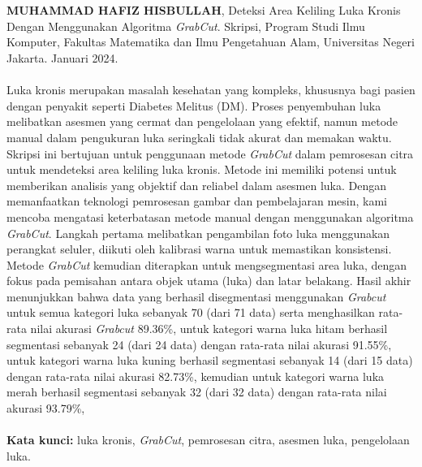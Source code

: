 \chapter*{}
\singlespacing{}

\textbf{MUHAMMAD HAFIZ HISBULLAH}, Deteksi Area Keliling Luka Kronis Dengan 
Menggunakan Algoritma \emph{GrabCut}. Skripsi, Program Studi Ilmu Komputer, Fakultas Matematika dan Ilmu Pengetahuan Alam, Universitas Negeri Jakarta. Januari 2024.
\\
\\
Luka kronis merupakan masalah kesehatan yang kompleks, khususnya bagi pasien dengan 
penyakit seperti Diabetes Melitus (DM). Proses penyembuhan luka melibatkan asesmen 
yang cermat dan pengelolaan yang efektif, namun metode manual dalam pengukuran 
luka seringkali tidak akurat dan memakan waktu. Skripsi ini bertujuan untuk penggunaan 
metode \emph{GrabCut} dalam pemrosesan citra untuk mendeteksi area keliling 
luka kronis. Metode ini memiliki potensi untuk memberikan analisis yang objektif 
dan reliabel dalam asesmen luka. Dengan memanfaatkan teknologi pemrosesan gambar 
dan pembelajaran mesin, kami mencoba mengatasi keterbatasan metode manual dengan 
menggunakan algoritma \emph{GrabCut}. Langkah pertama melibatkan pengambilan foto 
luka menggunakan perangkat seluler, diikuti oleh kalibrasi warna untuk memastikan 
konsistensi. Metode \emph{GrabCut} kemudian diterapkan untuk mengsegmentasi area 
luka, dengan fokus pada pemisahan antara objek utama (luka) dan latar belakang. 
Hasil akhir menunjukkan bahwa data yang berhasil disegmentasi menggunakan \emph{Grabcut}
untuk semua kategori luka sebanyak 70 (dari 71 data) serta menghasilkan rata-rata 
nilai akurasi \emph{Grabcut} 89.36\%, untuk kategori warna luka hitam berhasil 
segmentasi sebanyak 24 (dari 24 data) dengan rata-rata nilai akurasi 91.55\%,
untuk kategori warna luka kuning berhasil segmentasi sebanyak 14 (dari 15 data) 
dengan rata-rata nilai akurasi 82.73\%, kemudian untuk kategori warna luka merah 
berhasil segmentasi sebanyak 32 (dari 32 data) dengan rata-rata nilai akurasi 93.79\%,
\\
\\
\textbf{Kata kunci:} luka kronis, \emph{GrabCut}, pemrosesan citra, asesmen luka, pengelolaan luka.
